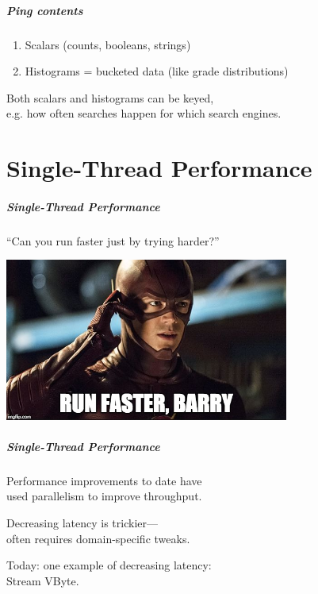 \begin{frame}
\frametitle{Ping contents}
\Large

\begin{enumerate}
\item Scalars (counts, booleans, strings)
\item Histograms = bucketed data (like grade distributions)
\end{enumerate}

Both scalars and histograms can be keyed, \\
e.g. how often searches happen for which search engines.
\end{frame}

\part{Single-Thread Performance}



\begin{frame}
\frametitle{Single-Thread Performance}

``Can you run faster just by trying harder?''

\begin{center}
\includegraphics[width=0.7\textwidth]{images/theflash.jpg}
\end{center}

\end{frame}


\begin{frame}
\frametitle{Single-Thread Performance}
\Large
\begin{changemargin}{2cm}
Performance improvements to date have \\
used parallelism
to improve throughput. 

Decreasing latency is trickier---\\
often requires domain-specific
tweaks. 

Today: one example of decreasing latency: \\
\hspace*{2em} Stream VByte.
\end{changemargin}

\end{frame}


